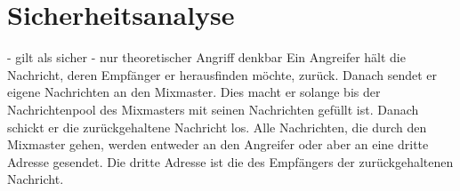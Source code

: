 \section{Sicherheitsanalyse}
- gilt als sicher
- nur theoretischer Angriff denkbar
Ein Angreifer hält die Nachricht, deren Empfänger er herausfinden möchte, zurück. Danach sendet er eigene Nachrichten an den Mixmaster. Dies macht er solange bis der Nachrichtenpool des Mixmasters mit seinen Nachrichten gefüllt ist. Danach schickt er die zurückgehaltene Nachricht los. Alle Nachrichten, die durch den Mixmaster gehen, werden entweder an den Angreifer oder aber an eine dritte Adresse gesendet. Die dritte Adresse ist die des Empfängers der zurückgehaltenen Nachricht.